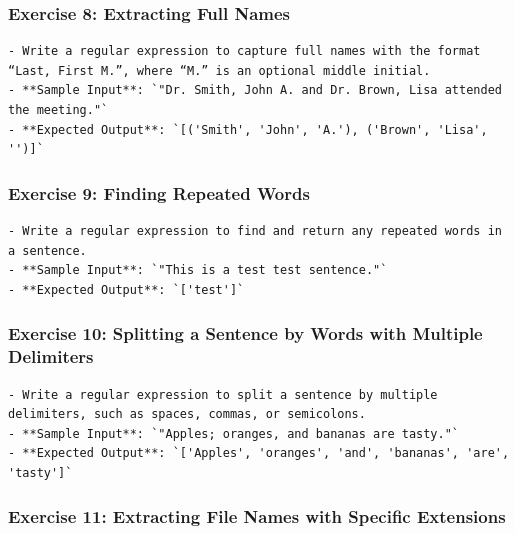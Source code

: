 \documentclass[
  letterpaper,
  DIV=11,
  numbers=noendperiod]{scrreprt}
\begin{document}
\hypertarget{exercise-8-extracting-full-names}{%
\subsubsection{Exercise 8: Extracting Full
Names}\label{exercise-8-extracting-full-names}}

\begin{verbatim}
- Write a regular expression to capture full names with the format “Last, First M.”, where “M.” is an optional middle initial.
- **Sample Input**: `"Dr. Smith, John A. and Dr. Brown, Lisa attended the meeting."`
- **Expected Output**: `[('Smith', 'John', 'A.'), ('Brown', 'Lisa', '')]`
\end{verbatim}

\hypertarget{exercise-9-finding-repeated-words}{%
\subsubsection{Exercise 9: Finding Repeated
Words}\label{exercise-9-finding-repeated-words}}

\begin{verbatim}
- Write a regular expression to find and return any repeated words in a sentence.
- **Sample Input**: `"This is a test test sentence."`
- **Expected Output**: `['test']`
\end{verbatim}

\hypertarget{exercise-10-splitting-a-sentence-by-words-with-multiple-delimiters}{%
\subsubsection{Exercise 10: Splitting a Sentence by Words with Multiple
Delimiters}\label{exercise-10-splitting-a-sentence-by-words-with-multiple-delimiters}}

\begin{verbatim}
- Write a regular expression to split a sentence by multiple delimiters, such as spaces, commas, or semicolons.
- **Sample Input**: `"Apples; oranges, and bananas are tasty."`
- **Expected Output**: `['Apples', 'oranges', 'and', 'bananas', 'are', 'tasty']`
\end{verbatim}

\hypertarget{exercise-11-extracting-file-names-with-specific-extensions}{%
\subsubsection{Exercise 11: Extracting File Names with Specific
Extensions}\label{exercise-11-extracting-file-names-with-specific-extensions}}
\end{document}
